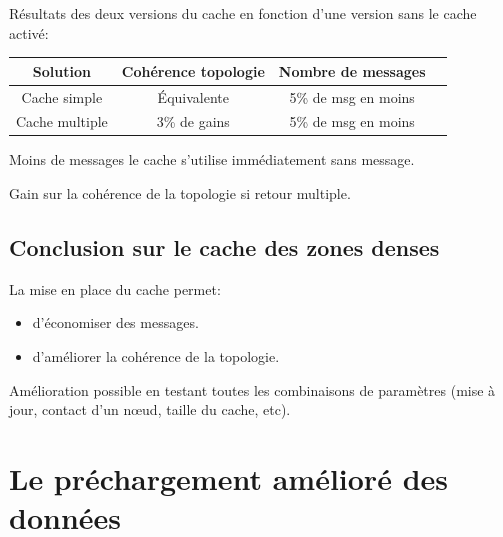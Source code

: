 \documentclass{beamer}
\begin{document}
  \begin{frame}
  	Résultats des deux versions du cache en fonction d'une version sans le cache activé:
	\begin{table}[!h]
  		\begin{center}
    		\begin{tabular}{|c|c|c|c|}
      		\hline
      		Solution & Cohérence topologie & Nombre de messages \\
      		\hline
      		Cache simple & Équivalente &  5\% de msg en moins\\
      		Cache multiple & 3\% de gains &  5\% de msg en moins\\
      		\hline
    		\end{tabular}
  		\end{center}
	\end{table}
	\begin{itemize}\footnotesize{
		\item Moins de messages le cache s'utilise immédiatement sans message.
		\item Gain sur la cohérence de la topologie si retour multiple.
	}
	\end{itemize}	
  \end{frame}
	
  \subsection{Conclusion sur le cache des zones denses}
  \begin{frame}
  	La mise en place du cache permet:\\
	\begin{itemize}
		\item d'économiser des messages.\\
		\item d'améliorer la cohérence de la topologie.\\
	\end{itemize}
	\vspace{5mm}
	Amélioration possible en testant toutes les combinaisons de paramètres (mise à jour, contact d'un nœud, taille du cache, etc).\\
  \end{frame}



  \section{Le préchargement amélioré des données}
\end{document}
